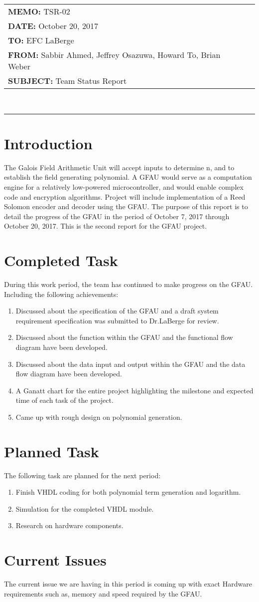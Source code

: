 \documentclass[paper=usletter, fontsize=12pt]{article}
\newcommand{\Sabbir}{Sabbir Ahmed}
\newcommand{\Jeffrey}{Jeffrey Osazuwa}
\newcommand{\Howard}{Howard To}
\newcommand{\Brian}{Brian Weber}
\newcommand{\documentinfo}[5]{
    \begin{centering}
        \parbox{6.8in}{
        \begin{spacing}{1}
            \begin{flushleft}
                \begin{tabular}{l l}
                    #1 \\
                    #2 \\
                    #3 \\
                    #4 \\
                    #5 \\
                \end{tabular} \\
                \rule{\textwidth}{1pt}
            \end{flushleft}
        \end{spacing}
        }
    \end{centering}
}
\begin{document}
\documentinfo{\textbf{MEMO:} TSR-02}{\textbf{DATE: }October 20, 2017}{\textbf{TO: } EFC LaBerge}{\textbf{FROM: }\Sabbir, \Jeffrey, \Howard, \Brian}{\textbf{SUBJECT: } Team Status Report}


\section{Introduction}

The Galois Field Arithmetic Unit will accept inputs to determine n, and to establish the field generating polynomial. A GFAU would serve as a computation engine for a relatively low-powered microcontroller, and would enable complex code and encryption algorithms. Project will include implementation of a Reed Solomon encoder and decoder using the GFAU. The purpose of this report is to detail the progress of the GFAU in the period of October 7, 2017 through October 20, 2017. This is the second report for the GFAU project. 


\section{Completed Task}

During this work period, the team has continued to make progress on the GFAU. Including the following achievements: 

\begin{enumerate}
	\item Discussed about the specification of the GFAU and a draft system requirement specification was submitted to Dr.LaBerge for review.
	\item Discussed about the function within the GFAU and the functional flow diagram have been developed.
	\item Discussed about the data input and output within the GFAU and the data flow diagram have been developed.
	\item A Ganatt chart for the entire project highlighting the milestone and expected time of each task of the project.   
	\item Came up with rough design on polynomial generation.
	
\end{enumerate}
\section{Planned Task}
The following task are planned for the next period:

\begin{enumerate}
	\item Finish VHDL coding for both polynomial term generation and logarithm.
	\item Simulation for the completed VHDL module. 
	\item Research on hardware components.
\end{enumerate}

\section{Current Issues}
The current issue we are having in this period is coming up with exact Hardware requirements such as, memory and speed required by the GFAU.
\end{document}
